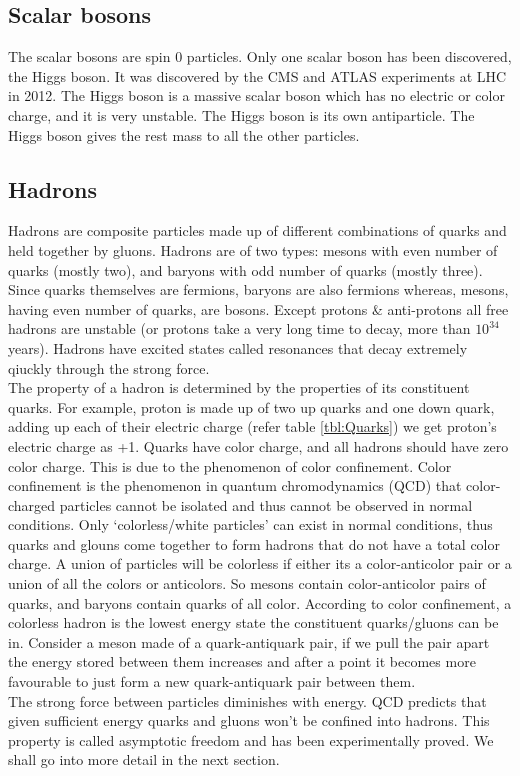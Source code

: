 \documentclass[12pt,a4paper,twoside]{report}
\begin{document}
\subsection{Scalar bosons}
The scalar bosons are spin 0 particles. Only one scalar boson has been discovered, the Higgs boson. It was discovered by the CMS and ATLAS experiments at LHC in 2012. The Higgs boson is a massive scalar boson which has no electric or color charge, and it is very unstable. The Higgs boson is its own antiparticle. The Higgs boson gives the rest mass to all the other particles.
\subsection{Hadrons}
Hadrons are composite particles made up of different combinations of quarks and held together by gluons. Hadrons are of two types: mesons with even number of quarks (mostly two), and baryons with odd number of quarks (mostly three). Since quarks themselves are fermions, baryons are also fermions whereas, mesons, having even number of quarks, are bosons. Except protons \& anti-protons all free hadrons are unstable (or protons take a very long time to decay, more than $10^{34}$ years). Hadrons have excited states called resonances that decay extremely qiuckly through the strong force.\\
The property of a hadron is determined by the properties of its constituent quarks. For example, proton is made up of two up quarks and one down quark, adding up each of their electric charge (refer table \ref{tbl:Quarks}) we get proton's electric charge as +1. Quarks have color charge, and all hadrons should have zero color charge. This is due to the phenomenon of color confinement. Color confinement is the phenomenon in quantum chromodynamics (QCD) that color-charged particles cannot be isolated and thus cannot be observed in normal conditions. Only `colorless/white particles' can exist in normal conditions, thus quarks and glouns come together to form hadrons that do not have a total color charge. A union of particles will be colorless if either its a color-anticolor pair or a union of all the colors or anticolors. So mesons contain color-anticolor pairs of quarks, and baryons contain quarks of all color. According to color confinement, a colorless hadron is the lowest energy state the constituent quarks/gluons can be in. Consider a meson made of a quark-antiquark pair, if we pull the pair apart the energy stored between them increases and after a point it becomes more favourable to just form a new quark-antiquark pair between them.\\
The strong force between particles diminishes with energy. QCD predicts that given sufficient energy quarks and gluons won't be confined into hadrons. This property is called asymptotic freedom and has been experimentally proved. We shall go into more detail in the next section.\\
 
\end{document}
